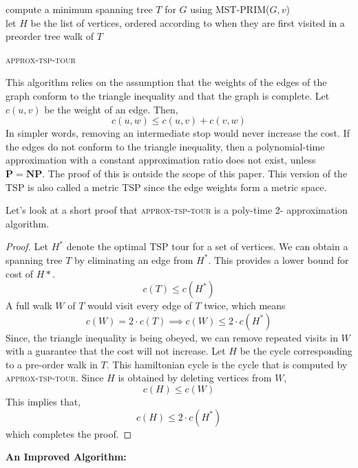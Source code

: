 \documentclass[12pt]{report}
\begin{document}
    \begin{algorithm*}
      compute a minimum spanning tree $T$ for $G$ using \textsc{MST-PRIM}($G, v$) \\
      let $H$ be the list of vertices, ordered according to when they are first visited in a
      preorder tree walk of $T$ \\
  \caption{\textsc{approx-tsp-tour}}
  \end{algorithm*}
    
  This algorithm relies on the assumption that the weights of the edges of the graph conform to the triangle inequality and that the graph is complete.
  Let $c(u,v)$ be the weight of an edge. Then, \[c(u,w) \leq c(u,v) + c(v, w) \]
  In simpler words, removing an intermediate stop would never increase the cost. If the edges do not conform to the triangle inequality, then a polynomial-time approximation
  with a constant approximation ratio does not exist, unless $\mathbf{P = NP}$. The proof of this
  is outside the scope of this paper. This version of the TSP is also called a metric TSP since 
  the edge weights form a metric space.   
  \par Let's look at a short proof that \textsc{approx-tsp-tour} is a poly-time 2- approximation algorithm. 
  \par
  \begin{proof}
  

    Let $H^*$ denote the optimal TSP tour for a set of vertices. We can obtain a spanning tree $T$ by eliminating an edge from 
    $H^*$. This provides a lower bound for cost of $H*$. 
    \[c(T) \leq c(H^*)\] A full walk $W$ of $T$ would visit every edge of $T$ twice, which means   
    \[c(W) = 2\cdot c(T) \implies c(W) \leq 2\cdot c(H^*)\]
  Since, the triangle inequality is being obeyed, we can remove repeated visits in $W$ with a guarantee that 
  the cost will not increase.
  Let $H$ be the cycle corresponding to a pre-order walk in $T$. This hamiltonian cycle is the cycle that is computed by 
  \textsc{approx-tsp-tour}. Since $H$ is obtained by deleting vertices from $W$,
  \[c(H) \leq c(W)\]
  This implies that, \[c(H) \leq 2\cdot c(H^*)\] which completes the proof. 
  \par
        \end{proof}
    \newpage
  {{\textbf{An Improved Algorithm:}}}  \par
  
\end{document}
